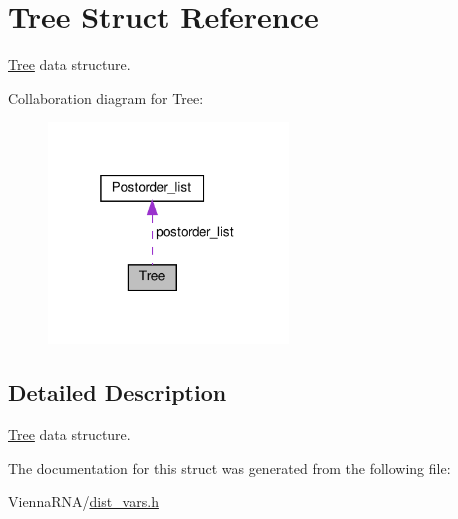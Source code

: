 \hypertarget{structTree}{}\section{Tree Struct Reference}
\label{structTree}


\hyperlink{structTree}{Tree} data structure.  




Collaboration diagram for Tree\+:
\nopagebreak
\begin{figure}[H]
\begin{center}
\leavevmode
\includegraphics[width=181pt]{structTree__coll__graph}
\end{center}
\end{figure}


\subsection{Detailed Description}
\hyperlink{structTree}{Tree} data structure. 

The documentation for this struct was generated from the following file\+:\begin{DoxyCompactItemize}
\item 
Vienna\+R\+N\+A/\hyperlink{dist__vars_8h}{dist\+\_\+vars.\+h}\end{DoxyCompactItemize}
